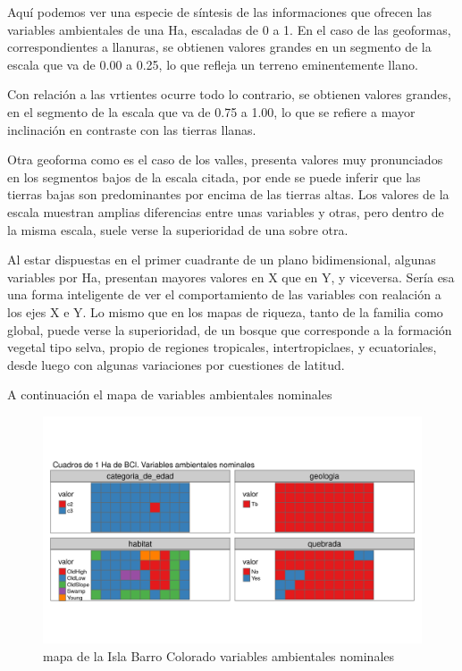 \documentclass[11pt,]{article}
\begin{document}
Aquí podemos ver una especie de síntesis de las informaciones que
ofrecen las variables ambientales de una Ha, escaladas de 0 a 1. En el
caso de las geoformas, correspondientes a llanuras, se obtienen valores
grandes en un segmento de la escala que va de 0.00 a 0.25, lo que
refleja un terreno eminentemente llano.

Con relación a las vrtientes ocurre todo lo contrario, se obtienen
valores grandes, en el segmento de la escala que va de 0.75 a 1.00, lo
que se refiere a mayor inclinación en contraste con las tierras llanas.

Otra geoforma como es el caso de los valles, presenta valores muy
pronunciados en los segmentos bajos de la escala citada, por ende se
puede inferir que las tierras bajas son predominantes por encima de las
tierras altas. Los valores de la escala muestran amplias diferencias
entre unas variables y otras, pero dentro de la misma escala, suele
verse la superioridad de una sobre otra.

Al estar dispuestas en el primer cuadrante de un plano bidimensional,
algunas variables por Ha, presentan mayores valores en X que en Y, y
viceversa. Sería esa una forma inteligente de ver el comportamiento de
las variables con realación a los ejes X e Y. Lo mismo que en los mapas
de riqueza, tanto de la familia como global, puede verse la
superioridad, de un bosque que corresponde a la formación vegetal tipo
selva, propio de regiones tropicales, intertropiclaes, y ecuatoriales,
desde luego con algunas variaciones por cuestiones de latitud.

A continuación el mapa de variables ambientales nominales

\begin{figure}
\centering
\includegraphics[width=1.00000\textwidth]{mapas_variables_ambientales_nominales_tmap.png}
\caption{mapa de la Isla Barro Colorado variables ambientales nominales
\label{fig:bci_map}}
\end{figure}
\end{document}
